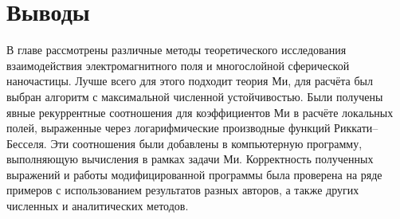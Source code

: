 \section{Выводы}

В главе рассмотрены различные методы теоретического исследования
взаимодействия электромагнитного поля и многослойной сферической
наночастицы. Лучше всего для этого подходит теория Ми, для расчёта был
выбран алгоритм с максимальной численной устойчивостью.  Были получены
явные рекуррентные соотношения для коэффициентов Ми в расчёте
локальных полей, выраженные через логарифмические производные функций
Риккати--Бесселя.  Эти соотношения были добавлены в компьютерную
программу, выполняющую вычисления в рамках задачи Ми. Корректность
полученных выражений и работы модифицированной программы была
проверена на ряде примеров с использованием результатов разных
авторов, а также других численных и аналитических методов.




\clearpage